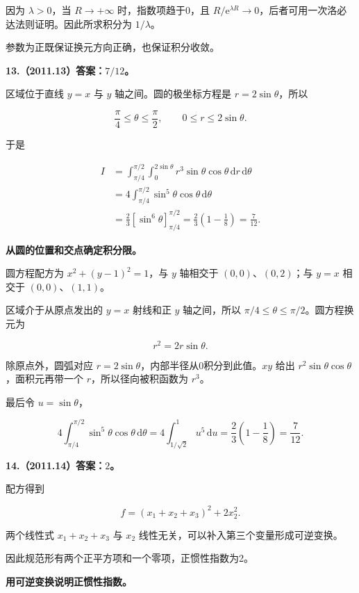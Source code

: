 \documentclass[UTF8,11pt,fontset=windows]{ctexart}
\begin{document}
因为 $\lambda>0$，当 $R\to+\infty$ 时，指数项趋于0，且 $R/\mathrm e^{\lambda R}\to0$，后者可用一次洛必达法则证明。因此所求积分为 $1/\lambda$。

参数为正既保证换元方向正确，也保证积分收敛。

\clearpage

\textbf{13.（2011.13）答案：$7/12$。}

区域位于直线 $y=x$ 与 $y$ 轴之间。圆的极坐标方程是 $r=2\sin\theta$，所以

$$
\frac\pi4\le\theta\le\frac\pi2,\qquad0\le r\le2\sin\theta.
$$

于是

$$
\begin{aligned}
I&=\int_{\pi/4}^{\pi/2}\int_0^{2\sin\theta}
 r^3\sin\theta\cos\theta\,\mathrm dr\,\mathrm d\theta\\
&=4\int_{\pi/4}^{\pi/2}\sin^5\theta\cos\theta\,\mathrm d\theta\\
&=\frac23\left[\sin^6\theta\right]_{\pi/4}^{\pi/2}
=\frac23\left(1-\frac18\right)=\frac7{12}.
\end{aligned}
$$

\textbf{从圆的位置和交点确定积分限。}

圆方程配方为 $x^2+(y-1)^2=1$，与 $y$ 轴相交于 $(0,0)$、$(0,2)$；与 $y=x$ 相交于 $(0,0)$、$(1,1)$。

区域介于从原点发出的 $y=x$ 射线和正 $y$ 轴之间，所以 $\pi/4\le\theta\le\pi/2$。圆方程换元为

$$
r^2=2r\sin\theta.
$$

除原点外，圆弧对应 $r=2\sin\theta$，内部半径从0积分到此值。$xy$ 给出 $r^2\sin\theta\cos\theta$，面积元再带一个 $r$，所以径向被积函数为 $r^3$。

最后令 $u=\sin\theta$，

$$
4\int_{\pi/4}^{\pi/2}\sin^5\theta\cos\theta\,\mathrm d\theta
=4\int_{1/\sqrt2}^{1}u^5\,\mathrm du
=\frac23\left(1-\frac18\right)=\frac7{12}.
$$

\clearpage

\textbf{14.（2011.14）答案：$2$。}

配方得到

$$
f=(x_1+x_2+x_3)^2+2x_2^2.
$$

两个线性式 $x_1+x_2+x_3$ 与 $x_2$ 线性无关，可以补入第三个变量形成可逆变换。

因此规范形有两个正平方项和一个零项，正惯性指数为2。

\textbf{用可逆变换说明正惯性指数。}
\end{document}
